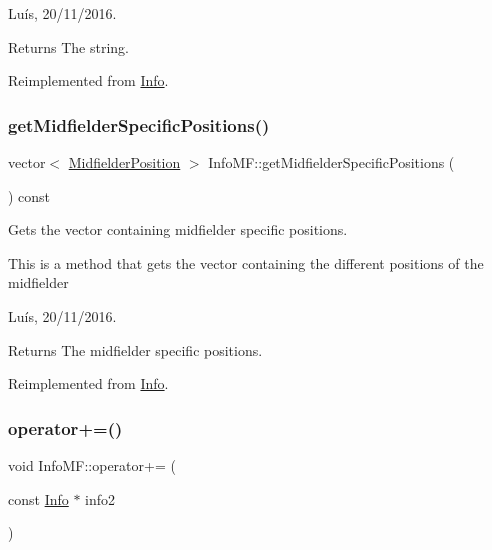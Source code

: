 Luís, 20/11/2016. 

\begin{DoxyReturn}{Returns}
The string. 
\end{DoxyReturn}


Reimplemented from \hyperlink{class_info_a5e52b35a9c17b58222bb57af16c16ce3}{Info}.

\hypertarget{class_info_m_f_a1f91cbfd828fdfd6970a3b91b5c04945}{}\label{class_info_m_f_a1f91cbfd828fdfd6970a3b91b5c04945} 
\subsubsection{\texorpdfstring{get\+Midfielder\+Specific\+Positions()}{getMidfielderSpecificPositions()}}
{\footnotesize\ttfamily vector$<$ \hyperlink{_utils_8hpp_a9f9328fe291d23e820ad594679abd217}{Midfielder\+Position} $>$ Info\+M\+F\+::get\+Midfielder\+Specific\+Positions (\begin{DoxyParamCaption}{ }\end{DoxyParamCaption}) const\hspace{0.3cm}{\ttfamily [virtual]}}



Gets the vector containing midfielder specific positions. 

This is a method that gets the vector containing the different positions of the midfielder

Luís, 20/11/2016. 

\begin{DoxyReturn}{Returns}
The midfielder specific positions. 
\end{DoxyReturn}


Reimplemented from \hyperlink{class_info_afb5cbe001c15498897fc4852bd08c114}{Info}.

\hypertarget{class_info_m_f_a937a1514afaedfa94b2f5372f91edce5}{}\label{class_info_m_f_a937a1514afaedfa94b2f5372f91edce5} 
\subsubsection{\texorpdfstring{operator+=()}{operator+=()}}
{\footnotesize\ttfamily void Info\+M\+F\+::operator+= (\begin{DoxyParamCaption}\item[{const \hyperlink{class_info}{Info} $\ast$}]{info2 }\end{DoxyParamCaption})\hspace{0.3cm}{\ttfamily [virtual]}}



